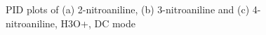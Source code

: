 \begin{figure}%
\centering
{}


\caption{PID plots of (a) 2-nitroaniline, (b) 3-nitroaniline and (c) 4-nitroaniline, H3O+, DC mode}
\label{fig:na_h3o_dc}
\end{figure}

